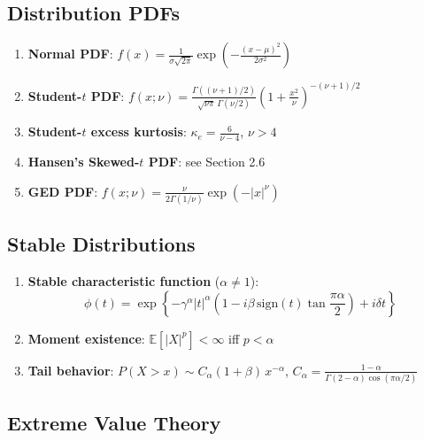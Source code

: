 \documentclass[11pt, a4paper]{article}
\newcommand{\E}{\mathbb{E}}
\theoremstyle{definition}
\begin{document}
\subsection{Distribution PDFs}

\begin{enumerate}[resume]
  \item \textbf{Normal PDF}: $f(x) = \frac{1}{\sigma\sqrt{2\pi}}\exp\!\left(-\frac{(x-\mu)^2}{2\sigma^2}\right)$

  \item \textbf{Student-$t$ PDF}: $f(x;\nu) = \frac{\Gamma((\nu+1)/2)}{\sqrt{\nu\pi}\,\Gamma(\nu/2)}\left(1 + \frac{x^2}{\nu}\right)^{-(\nu+1)/2}$

  \item \textbf{Student-$t$ excess kurtosis}: $\kappa_e = \frac{6}{\nu - 4}$, \quad $\nu > 4$

  \item \textbf{Hansen's Skewed-$t$ PDF}: see Section 2.6

  \item \textbf{GED PDF}: $f(x;\nu) = \frac{\nu}{2\Gamma(1/\nu)}\exp(-|x|^\nu)$
\end{enumerate}

\subsection{Stable Distributions}

\begin{enumerate}[resume]
  \item \textbf{Stable characteristic function} ($\alpha \neq 1$):
  \[
    \phi(t) = \exp\!\left\{-\gamma^\alpha|t|^\alpha\!\left(1 - i\beta\,\text{sign}(t)\tan\frac{\pi\alpha}{2}\right) + i\delta t\right\}
  \]

  \item \textbf{Moment existence}: $\E[|X|^p] < \infty$ iff $p < \alpha$

  \item \textbf{Tail behavior}: $P(X > x) \sim C_\alpha(1+\beta)\,x^{-\alpha}$, \quad $C_\alpha = \frac{1-\alpha}{\Gamma(2-\alpha)\cos(\pi\alpha/2)}$
\end{enumerate}

\subsection{Extreme Value Theory}
\end{document}
